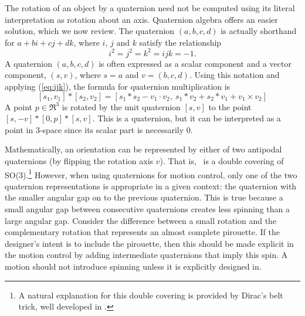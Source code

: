 \documentclass[11pt]{article}
\begin{document}
The rotation of an object by a quaternion need not be 
computed using its literal interpretation as rotation about an axis.
Quaternion algebra offers an easier solution, which we now review.
The quaternion $(a,b,c,d)$ is actually shorthand for $a + bi + cj + dk$,
where $i$, $j$ and $k$ satisfy the relationship 
\begin{equation}
\label{eq:ijk}
	i^2 = j^2 = k^2 = ijk = -1. 
\end{equation}
A quaternion $(a,b,c,d)$ is often expressed as a scalar component
and a vector component, $(s,v)$, where $s=a$ and $v=(b,c,d)$.
Using this notation and applying (\ref{eq:ijk}),
the formula for quaternion multiplication is
\begin{equation}
\label{eq:qmult}
	[s_1,v_1] * [s_2,v_2] =
	[s_1*s_2 - v_1 \cdot v_2,\ 
	 s_1 * v_2 + s_2 * v_1 + v_1 \times v_2]
\end{equation}
A point $p \in \Re^3$ is rotated by the unit quaternion $[s,v]$
to the point $[s,-v] * [0,p] * [s,v]$.
This is a quaternion, but it can be interpreted
as a point in 3-space since its scalar part is necessarily 0.

Mathematically, an orientation can be represented by either of two antipodal quaternions
(by flipping the rotation axis $v$).
That is, \ is a double covering of SO(3).\footnote{A natural
	explanation for this double covering is provided by Dirac's belt trick,
	well developed in \cite{hart94}.}
However, when using quaternions for motion control, only one of the two
quaternion representations is appropriate in a given context:
the quaternion with the smaller angular gap on  to the previous quaternion.
This is true because a small angular gap between consecutive quaternions
creates less spinning than a large angular gap.
Consider the difference between a small rotation and the complementary
rotation that represents an almost complete pirouette.
If the designer's intent is to include the pirouette, then this should be
made explicit in the motion control by adding intermediate quaternions
that imply this spin.
A motion should not introduce spinning unless it is explicitly designed in.
\end{document}
